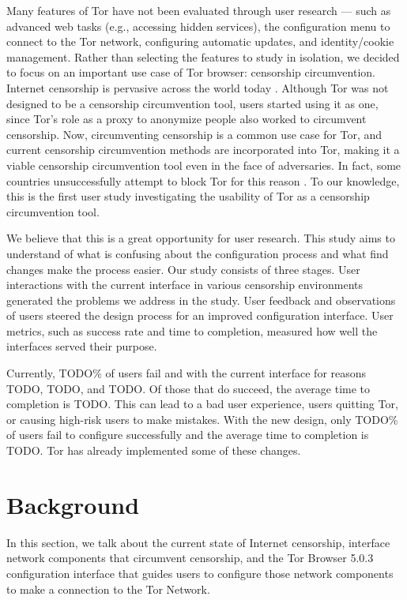 \documentclass{template}
\begin{document}
Many features of Tor have not been evaluated through user
research --- such as advanced web tasks (e.g., accessing hidden services), the
configuration menu to connect to the Tor network, configuring automatic
updates, and identity/cookie management. Rather than selecting the features to
study in isolation, we decided to focus on an important use case of Tor browser: censorship circumvention. 
Internet censorship is pervasive across the world today \cite{faris2008measuring}. 
Although Tor was not designed to be a censorship circumvention tool, users started
using it as one, since Tor's role as a proxy to anonymize
people also worked to circumvent censorship. Now, circumventing censorship is a
common use case for Tor, and current censorship circumvention methods are
incorporated into Tor, making it a viable censorship circumvention tool even in the face
of adversaries. In fact, some countries unsuccessfully attempt to block Tor for this reason \cite{winter2012great}. 
To our knowledge, this is the first user study investigating the usability of Tor as a 
censorship circumvention tool.

We believe that this is a great opportunity for user research. This study aims to understand of what is confusing about the configuration process and what find changes make the process easier. Our study consists of three stages. User interactions with the current interface in various censorship environments generated the problems we address in the study. User feedback and observations of users steered the design process for an improved configuration interface. User metrics, such as success rate and time to completion, measured how well the interfaces served their purpose.  

Currently, {\color {red} TODO}\% of users fail and with the current interface for reasons {\color {red} TODO}, {\color {red} TODO}, and {\color {red} TODO}. Of those that do succeed, the average time to completion is {\color {red} TODO}. This can lead to a bad user experience, users quitting Tor, or causing high-risk users to make mistakes. With the new design, only {\color {red} TODO}\% of users fail to configure successfully and the average time to completion is {\color {red} TODO}. Tor has already implemented some of these changes.


\section{Background} 
In this section, we talk about the current state of Internet censorship, interface network components that circumvent censorship, and the Tor Browser 5.0.3 configuration interface that guides users to configure those network components to make a connection to the Tor Network. 
\end{document}
